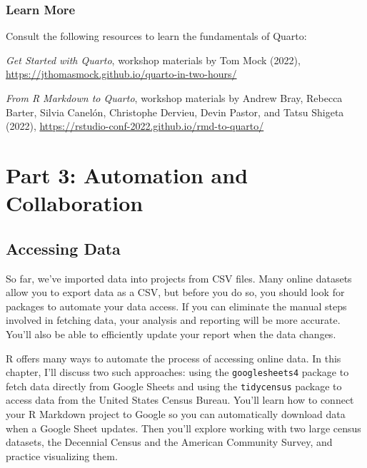 \documentclass[
]{book}
\begin{document}
\hypertarget{learn-more-9}{%
\section*{Learn More}\label{learn-more-9}}

Consult the following resources to learn the fundamentals of Quarto:

\emph{Get Started with Quarto}, workshop materials by Tom Mock (2022), \url{https://jthomasmock.github.io/quarto-in-two-hours/}

\emph{From R Markdown to Quarto}, workshop materials by Andrew Bray, Rebecca Barter, Silvia Canelón, Christophe Dervieu, Devin Pastor, and Tatsu Shigeta (2022), \url{https://rstudio-conf-2022.github.io/rmd-to-quarto/}

\hypertarget{part-part-3-automation-and-collaboration}{%
\part*{Part 3: Automation and Collaboration}\label{part-part-3-automation-and-collaboration}}

\hypertarget{accessing-data-chapter}{%
\chapter{Accessing Data}\label{accessing-data-chapter}}

So far, we've imported data into projects from CSV files. Many online datasets allow you to export data as a CSV, but before you do so, you should look for packages to automate your data access. If you can eliminate the manual steps involved in fetching data, your analysis and reporting will be more accurate. You'll also be able to efficiently update your report when the data changes.

R offers many ways to automate the process of accessing online data. In this chapter, I'll discuss two such approaches: using the \texttt{googlesheets4} package to fetch data directly from Google Sheets and using the \texttt{tidycensus} package to access data from the United States Census Bureau. You'll learn how to connect your R Markdown project to Google so you can automatically download data when a Google Sheet updates. Then you'll explore working with two large census datasets, the Decennial Census and the American Community Survey, and practice visualizing them.
\end{document}
